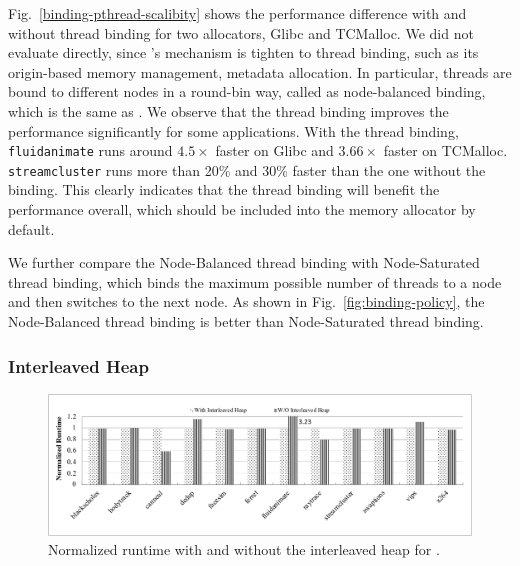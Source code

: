 
Fig.~\ref{binding-pthread-scalibity} shows the performance difference with and without thread binding for two allocators, Glibc and TCMalloc. We did not evaluate \NM{} directly, since \NM{}'s mechanism is tighten to thread binding, such as its origin-based memory management, metadata allocation. In particular, threads are bound to different nodes in a round-bin way, called as node-balanced binding, which is the same as \NM{}. We observe that the thread binding improves the performance significantly for some applications. With the thread binding, \texttt{fluidanimate} runs around $4.5\times$ faster on Glibc and $3.66\times$ faster on TCMalloc. \texttt{streamcluster} runs more than 20\% and 30\% faster than the one without the binding. This clearly indicates that the thread binding will benefit the performance overall, which should be included into the memory allocator by default. 

We further  compare the Node-Balanced thread binding with Node-Saturated thread binding, which binds the maximum possible number of threads to a node and then switches to the next node. As shown in Fig.~\ref{fig:binding-policy}, the Node-Balanced thread binding is better than Node-Saturated thread binding. 



\subsubsection{Interleaved Heap} 
\label{sec:interleavedheap}

\begin{figure}[!ht]
    \centering
    \includegraphics[width=5.5in]{figure/interleavedheap.pdf}
    \caption{Normalized runtime with and without the interleaved heap for \NM{}.  \label{fig:interleavedheap}}  
\end{figure}



